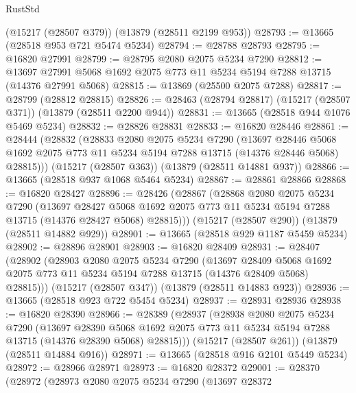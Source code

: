 \begin{lexlean}{RustStd}
\begin{coremodule}
    (@15217 (@28507 @379))
    (@13879 (@28511 @2199 @953))
@28793 := @13665 (@28518 @953 @721 @5474 @5234)
@28794 := @28788 @28793
@28795 := @16820 @27991
@28799 := @28795 @2080 @2075 @5234 @7290
@28812 := @13697 @27991 @5068 @1692 @2075 @773 @11 @5234 @5194 @7288 @13715 (@14376 @27991 @5068)
@28815 := @13869 (@25500 @2075 @7288)
@28817 := @28799 (@28812 @28815)
@28826 := @28463 (@28794 @28817) (@15217 (@28507 @371)) (@13879 (@28511 @2200 @944))
@28831 := @13665 (@28518 @944 @1076 @5469 @5234)
@28832 := @28826 @28831
@28833 := @16820 @28446
@28861 := @28444
    (@28832
      (@28833
        @2080
        @2075
        @5234
        @7290
        (@13697
          @28446
          @5068
          @1692
          @2075
          @773
          @11
          @5234
          @5194
          @7288
          @13715
          (@14376 @28446 @5068)
          @28815)))
    (@15217 (@28507 @363))
    (@13879 (@28511 @14881 @937))
@28866 := @13665 (@28518 @937 @1068 @5464 @5234)
@28867 := @28861 @28866
@28868 := @16820 @28427
@28896 := @28426
    (@28867
      (@28868
        @2080
        @2075
        @5234
        @7290
        (@13697
          @28427
          @5068
          @1692
          @2075
          @773
          @11
          @5234
          @5194
          @7288
          @13715
          (@14376 @28427 @5068)
          @28815)))
    (@15217 (@28507 @290))
    (@13879 (@28511 @14882 @929))
@28901 := @13665 (@28518 @929 @1187 @5459 @5234)
@28902 := @28896 @28901
@28903 := @16820 @28409
@28931 := @28407
    (@28902
      (@28903
        @2080
        @2075
        @5234
        @7290
        (@13697
          @28409
          @5068
          @1692
          @2075
          @773
          @11
          @5234
          @5194
          @7288
          @13715
          (@14376 @28409 @5068)
          @28815)))
    (@15217 (@28507 @347))
    (@13879 (@28511 @14883 @923))
@28936 := @13665 (@28518 @923 @722 @5454 @5234)
@28937 := @28931 @28936
@28938 := @16820 @28390
@28966 := @28389
    (@28937
      (@28938
        @2080
        @2075
        @5234
        @7290
        (@13697
          @28390
          @5068
          @1692
          @2075
          @773
          @11
          @5234
          @5194
          @7288
          @13715
          (@14376 @28390 @5068)
          @28815)))
    (@15217 (@28507 @261))
    (@13879 (@28511 @14884 @916))
@28971 := @13665 (@28518 @916 @2101 @5449 @5234)
@28972 := @28966 @28971
@28973 := @16820 @28372
@29001 := @28370
    (@28972
      (@28973
        @2080
        @2075
        @5234
        @7290
        (@13697
          @28372

\end{coremodule}
\end{lexlean}
